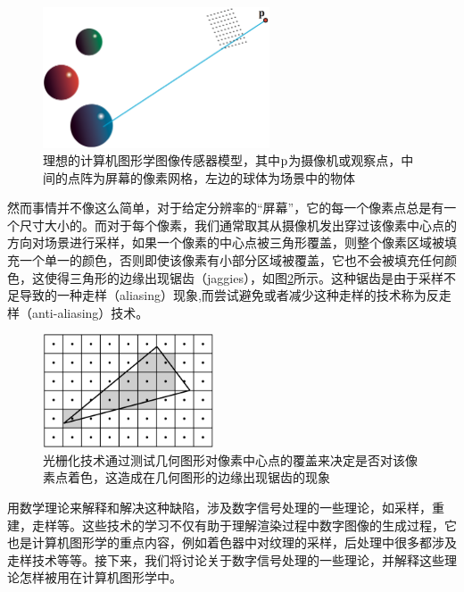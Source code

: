 \begin{figure}
\sidecaption
	\includegraphics[width=0.6\textwidth]{figures/intro/camera}
	\caption{理想的计算机图形学图像传感器模型，其中${\rm p}$为摄像机或观察点，中间的点阵为屏幕的像素网格，左边的球体为场景中的物体}
	\label{f:intro-camera}
\end{figure}

然而事情并不像这么简单，对于给定分辨率的“屏幕”，它的每一个像素点总是有一个尺寸大小的。而对于每个像素，我们通常取其从摄像机发出穿过该像素中心点的方向对场景进行采样，如果一个像素的中心点被三角形覆盖，则整个像素区域被填充一个单一的颜色，否则即使该像素有小部分区域被覆盖，它也不会被填充任何颜色，这使得三角形的边缘出现锯齿（jaggies），如图\ref{f:intro-aliasing-triangle}所示。这种锯齿是由于采样不足导致的一种走样（aliasing）现象,而尝试避免或者减少这种走样的技术称为反走样（anti-aliasing）技术。

\begin{figure}
\sidecaption
	\includegraphics[width=0.45\textwidth]{figures/intro/aliasing-triangle}
	\caption{光栅化技术通过测试几何图形对像素中心点的覆盖来决定是否对该像素点着色，这造成在几何图形的边缘出现锯齿的现象}
	\label{f:intro-aliasing-triangle}
\end{figure}

用数学理论来解释和解决这种缺陷，涉及数字信号处理的一些理论，如采样，重建，走样等。这些技术的学习不仅有助于理解渲染过程中数字图像的生成过程，它也是计算机图形学的重点内容，例如着色器中对纹理的采样，后处理中很多都涉及走样技术等等。接下来，我们将讨论关于数字信号处理的一些理论，并解释这些理论怎样被用在计算机图形学中。

